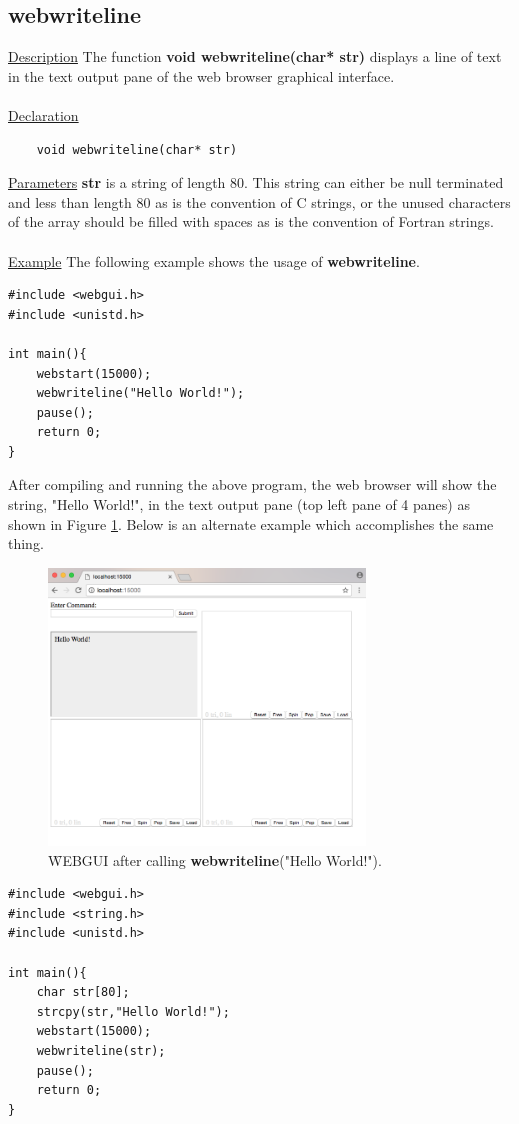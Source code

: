 \newpage
\subsection{webwriteline}
\label{sec:2-2}
\underline{Description} The function \textbf{void webwriteline(char* str)} displays a line of text in the text
output pane of the web browser graphical interface. \\
\\
\underline{Declaration}
\begin{verbatim} 
	void webwriteline(char* str)
\end{verbatim}
\underline{Parameters} \textbf{str} is a string of length 80. This string can either be null terminated and less than length 80 as is the convention 
of C strings, or the unused characters of the array should be filled with spaces as is the convention of Fortran strings.\\
\\
\underline{Example} The following example shows the usage of \textbf{webwriteline}.
\begin{verbatim}
#include <webgui.h>
#include <unistd.h>

int main(){
    webstart(15000);
    webwriteline("Hello World!");
    pause();
    return 0;
}
\end{verbatim}
After compiling and running the above program, the web browser will show the string, "Hello World!", in
the text output pane (top left pane of 4 panes) as shown in Figure \ref{fig:2}. Below is an alternate example
which accomplishes the same thing.

\begin{figure}[p!]
\centering
\includegraphics[width=0.75\textwidth]{pix/helloworld.png}
\caption{\f{WEBGUI} after calling \textbf{webwriteline}("Hello World!").}
\label{fig:2}
\end{figure}
\begin{verbatim}
#include <webgui.h>
#include <string.h>
#include <unistd.h>

int main(){
    char str[80];
    strcpy(str,"Hello World!");
    webstart(15000);
    webwriteline(str);
    pause();
    return 0;
}
\end{verbatim}

